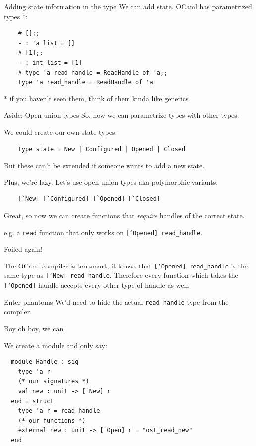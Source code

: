 \documentclass{beamer}
\renewcommand{\example}[1]{{\usebeamercolor[fg]{example text} #1}}
\begin{document}
\begin{frame}[fragile]{Adding state information in the type}
  We can add state. OCaml has parametrized types *:

  \begin{verbatim}
    # [];;
    - : 'a list = []
    # [1];;
    - : int list = [1]
    # type 'a read_handle = ReadHandle of 'a;;
    type 'a read_handle = ReadHandle of 'a
  \end{verbatim}

  * if you haven't seen them, think of them kinda like generics
\end{frame}

\begin{frame}[fragile]{Aside: Open union types}
  So, now we can \example{parametrize types with other types}.

  We could create our own state types:
  \begin{verbatim}
    type state = New | Configured | Opened | Closed
  \end{verbatim}
  \pause
  But these \alert{can't be extended} if someone wants to add a new state.
  \pause

  Plus, we're lazy. Let's use \example{open union types} aka polymorphic variants:
  \begin{verbatim}
    [`New] [`Configured] [`Opened] [`Closed]
  \end{verbatim}
\end{frame}

\begin{frame}
  Great, so now we can create functions that \emph{require} handles of the correct
  state.

  e.g. a \texttt{read} function that only works on \texttt{[`Opened] read\_handle}.

  \pause
  \alert{Foiled again!}
  \pause

  The OCaml compiler is too smart, it knows that \texttt{[`Opened] read\_handle} is
  the same type as \texttt{[`New] read\_handle}. Therefore every function which takes
  the \texttt{[`Opened]} handle accepts every other type of handle as well.
\end{frame}

\begin{frame}[fragile]{Enter phantoms}
  We'd need to \alert{hide} the actual \texttt{read\_handle} type from the compiler.

  \pause

  Boy oh boy, we can!

  \pause

  We create a module and only say:
  \begin{verbatim}
  module Handle : sig
    type 'a r
    (* our signatures *)
    val new : unit -> [`New] r
  end = struct
    type 'a r = read_handle
    (* our functions *)
    external new : unit -> [`Open] r = "ost_read_new"
  end
  \end{verbatim}
\end{frame}
\end{document}
